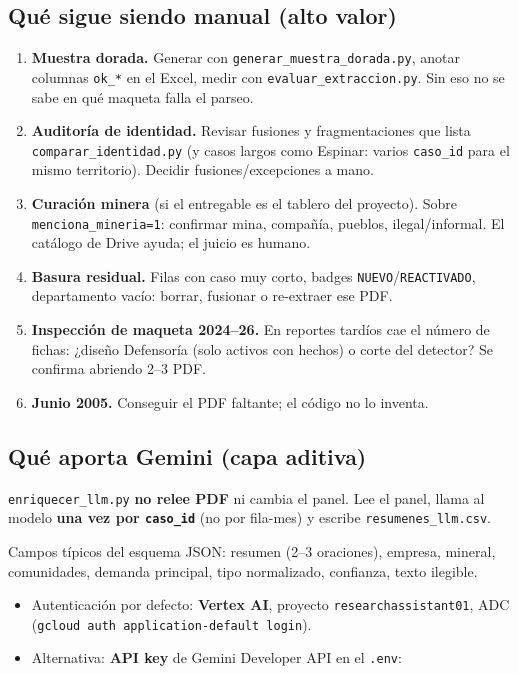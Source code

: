 \documentclass[11pt,a4paper]{article}
\begin{document}
\subsection{Qué sigue siendo manual (alto valor)}

\begin{enumerate}
  \item \textbf{Muestra dorada.} Generar con \texttt{generar\_muestra\_dorada.py}, anotar columnas \texttt{ok\_*} en el Excel, medir con \texttt{evaluar\_extraccion.py}. Sin eso no se sabe en qué maqueta falla el parseo.
  \item \textbf{Auditoría de identidad.} Revisar fusiones y fragmentaciones que lista \texttt{comparar\_identidad.py} (y casos largos como Espinar: varios \texttt{caso\_id} para el mismo territorio). Decidir fusiones/excepciones a mano.
  \item \textbf{Curación minera} (si el entregable es el tablero del proyecto). Sobre \texttt{menciona\_mineria=1}: confirmar mina, compañía, pueblos, ilegal/informal. El catálogo de Drive ayuda; el juicio es humano.
  \item \textbf{Basura residual.} Filas con caso muy corto, badges \texttt{NUEVO}/\texttt{REACTIVADO}, departamento vacío: borrar, fusionar o re-extraer ese PDF.
  \item \textbf{Inspección de maqueta 2024--26.} En reportes tardíos cae el número de fichas: ¿diseño Defensoría (solo activos con hechos) o corte del detector? Se confirma abriendo 2--3 PDF.
  \item \textbf{Junio 2005.} Conseguir el PDF faltante; el código no lo inventa.
\end{enumerate}

\subsection{Qué aporta Gemini (capa aditiva)}

\texttt{enriquecer\_llm.py} \textbf{no relee PDF} ni cambia el panel. Lee el panel, llama al modelo \textbf{una vez por \texttt{caso\_id}} (no por fila-mes) y escribe \texttt{resumenes\_llm.csv}.

Campos típicos del esquema JSON: resumen (2--3 oraciones), empresa, mineral, comunidades, demanda principal, tipo normalizado, confianza, texto ilegible.

\begin{itemize}
  \item Autenticación por defecto: \textbf{Vertex AI}, proyecto \texttt{researchassistant01}, ADC (\texttt{gcloud auth application-default login}).
  \item Alternativa: \textbf{API key} de Gemini Developer API en el \texttt{.env}:
\end{itemize}
\end{document}
